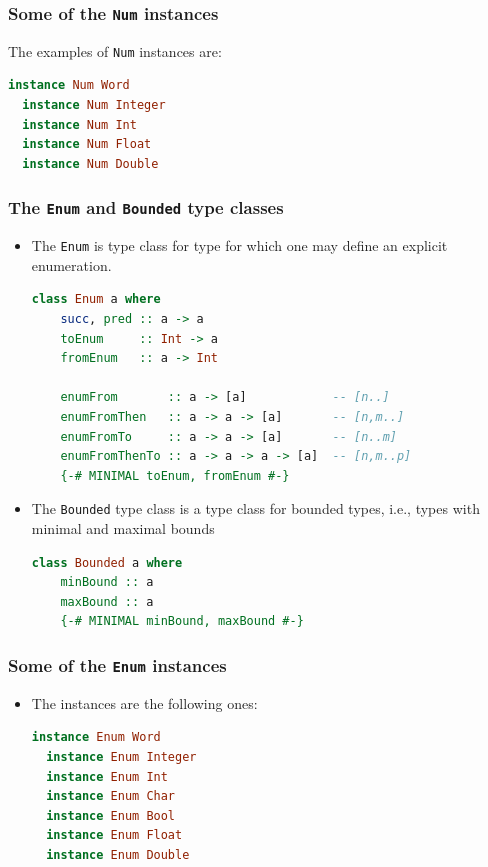 \documentclass[10pt,pdf,utf8,russian,aspectratio=169]{beamer}
\begin{document}
\begin{frame}[fragile]
  \frametitle{Some of the \verb"Num" instances}

The examples of \verb"Num" instances are:

\begin{lstlisting}[language=Haskell]
  instance Num Word
  instance Num Integer
  instance Num Int
  instance Num Float
  instance Num Double
\end{lstlisting}
\end{frame}

\begin{frame}[fragile]
  \frametitle{The \verb"Enum" and \verb"Bounded" type classes}

\begin{itemize}
  \item The \verb"Enum" is type class for type for which one may define an explicit enumeration.
\begin{lstlisting}[language=Haskell]
  class Enum a where
    succ, pred :: a -> a
    toEnum     :: Int -> a
    fromEnum   :: a -> Int

    enumFrom       :: a -> [a]            -- [n..]
    enumFromThen   :: a -> a -> [a]       -- [n,m..]
    enumFromTo     :: a -> a -> [a]       -- [n..m]
    enumFromThenTo :: a -> a -> a -> [a]  -- [n,m..p]
    {-# MINIMAL toEnum, fromEnum #-}
  \end{lstlisting}

\item The \verb"Bounded" type class is a type class for bounded types, i.e., types with minimal and maximal bounds
\begin{lstlisting}[language=Haskell]
  class Bounded a where
    minBound :: a
    maxBound :: a
    {-# MINIMAL minBound, maxBound #-}
  \end{lstlisting}
\end{itemize}
\end{frame}

\begin{frame}[fragile]
  \frametitle{Some of the \verb"Enum" instances}

\begin{itemize}
  \item The instances are the following ones:
\begin{lstlisting}[language=Haskell]
  instance Enum Word
  instance Enum Integer
  instance Enum Int
  instance Enum Char
  instance Enum Bool
  instance Enum Float
  instance Enum Double
\end{lstlisting}
\end{itemize}
\end{frame}
\end{document}
